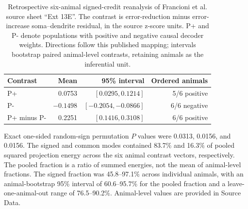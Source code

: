 \begin{table}[ht]
\centering
\caption{Retrospective six-animal signed-credit reanalysis of Francioni et al. source sheet ``Ext 13E''. The contrast is error-reduction minus error-increase soma--dendrite residual, in the source z-score units. P+ and P- denote populations with positive and negative causal decoder weights. Directions follow this published mapping; intervals bootstrap paired animal-level contrasts, retaining animals as the inferential unit.}
\label{tab:animal_credit}
\small
\begin{tabular}{lrrr}
\toprule
Contrast & Mean & 95\% interval & Ordered animals \\
\midrule
P+ & 0.0753 & $[0.0295,0.1214]$ & 5/6 positive \\
P- & $-0.1498$ & $[-0.2054,-0.0866]$ & 6/6 negative \\
P+ minus P- & 0.2251 & $[0.1416,0.3108]$ & 6/6 positive \\
\bottomrule
\end{tabular}

\vspace{4pt}
\small Exact one-sided random-sign permutation $P$ values were 0.0313,
0.0156, and 0.0156. The signed and common modes contained 83.7\% and 16.3\%
of pooled squared projection energy across the six animal contrast vectors,
respectively. The pooled fraction is a ratio of summed energies, not the
mean of animal-level fractions. The signed fraction was 45.8--97.1\% across individual animals,
with an animal-bootstrap 95\% interval of 60.6--95.7\% for the pooled
fraction and a leave-one-animal-out range of 76.5--90.2\%. Animal-level values
are provided in Source Data.
\end{table}

